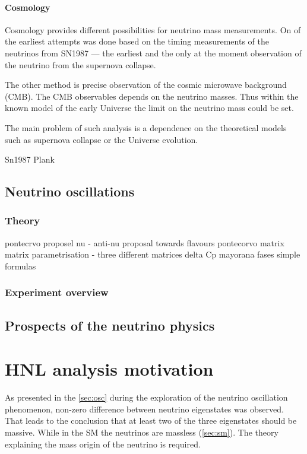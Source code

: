 \documentclass[../main.tex]{subfiles}
\begin{document}
\subsubsection{Cosmology}
Cosmology provides different possibilities for neutrino mass measurements. On of the earliest attempts was done based on the timing measurements of the neutrinos from SN1987 --- the earliest and the only at the moment observation of the neutrino from the supernova collapse.

The other method is precise observation of the cosmic microwave background (CMB). The CMB observables depends on the neutrino masses. Thus within the known model of the early Universe the limit on the neutrino mass could be set.

The main problem of such analysis is a dependence on the theoretical models such as supernova collapse or the Universe evolution.

Sn1987
Plank


\section{Neutrino oscillations}
\label{sec:osc}

\subsection{Theory}
pontecrvo proposel nu - anti-nu
proposal towards flavours
pontecorvo matrix
matrix parametrisation - three different matrices
delta Cp mayorana fases
simple formulas

\subsection{Experiment overview}
\label{sec:exp}



\section{Prospects of the neutrino physics}





\chapter{HNL analysis motivation}
\label{ch:intro:HNL}

As presented in the \autoref{sec:osc} during the exploration of the neutrino oscillation phenomenon, non-zero difference between neutrino eigenstates was observed. That leads to the conclusion that at least two of the three eigenstates should be massive. While in the SM the neutrinos are massless (\autoref{sec:sm}). The theory explaining the mass origin of the neutrino is required.
\end{document}
